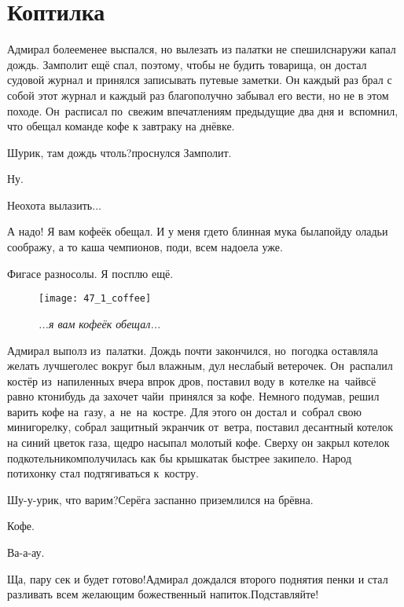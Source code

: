 \chapter{Коптилка}
\vepsianrose

Адмирал более\sdash менее выспался, но вылезать из палатки не спешил\mdash снаружи капал дождь. Замполит ещё спал, поэтому, чтобы не будить товарища, он достал судовой журнал и принялся записывать путевые заметки. Он каждый раз брал с собой этот журнал и каждый раз благополучно забывал его вести, но не в этом походе. Он~расписал по~свежим впечатлениям предыдущие два дня и~вспомнил, что обещал команде кофе к завтраку на днёвке.

\diagdash Шурик, там дождь чтоль?\mdash проснулся Замполит.

\diagdash Ну.

\diagdash Неохота вылазить$\ldots$

\diagdash А надо! Я вам кофеёк обещал. И у меня где\sdash то блинная мука была\mdash пойду оладьи соображу, а то каша чемпионов, поди, всем надоела уже.

\diagdash Фигасе разносолы. Я посплю ещё.

\newpage
\begin{wrapfigure}[13]{l}{0.5\textwidth}
	\centering
	\texttt{[image: 47\_1\_coffee]}
	\caption{\small\textit{...я вам кофеёк обещал...}}
\end{wrapfigure}
Адмирал выполз из~палатки. Дождь почти закончился, но~погодка оставляла желать лучшего\mdash лес вокруг был влажным, дул неслабый ветерочек. Он~распалил костёр из~напиленных вчера впрок дров, поставил воду в~котелке на~чай\mdash всё равно кто\sdash нибудь да захочет чай\mdash и~принялся за кофе. Немного подумав, решил варить кофе на~газу, а~не~на~костре. Для этого он достал и~собрал свою мини\sdash горелку, собрал защитный экранчик от~ветра, поставил десантный котелок на синий цветок газа, щедро насыпал молотый кофе. Сверху он закрыл котелок подкотельником\mdash получилась как бы крышка\mdash так быстрее закипело. Народ потихонку стал подтягиваться к~костру.

\diagdash Шу-у-урик, что варим?\mdash Серёга заспанно приземлился на брёвна.

\diagdash Кофе.

\diagdash Ва-а-ау.

\diagdash Ща, пару сек и будет готово!\mdash Адмирал дождался второго поднятия пенки и стал разливать всем желающим божественный напиток.\mdash Подставляйте!

